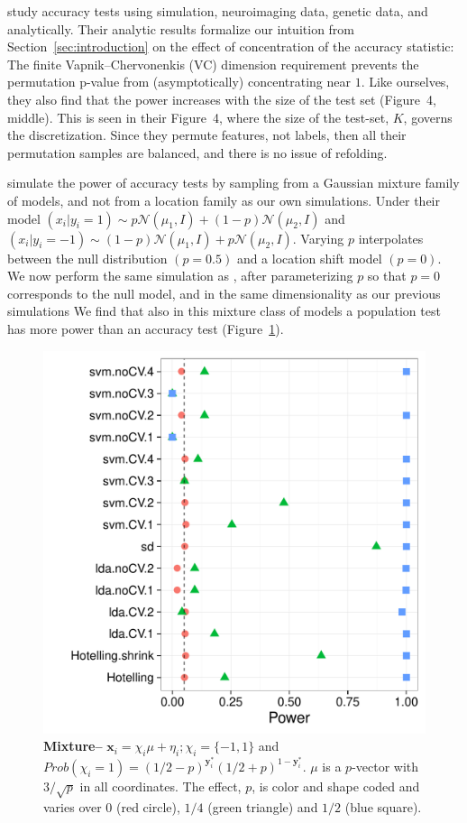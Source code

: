 \documentclass[12pt,a4paper]{article}
\theoremstyle{definition}
\newcommand{\set}[1]{\{ #1 \}} %
\newcommand{\prob}[1]{Prob( #1 )} %
\newcommand{\rv}[1]{\mathbf{#1}} %
\newcommand{\x}{\rv x} %
\newcommand{\y}{\rv y} %
\newcommand{\gauss}[1]{\mathcal{N}\left(#1\right)} %
\begin{document}
\cite{golland_permutation_2005} study accuracy tests using simulation, neuroimaging data, genetic data, and analytically.
Their analytic results formalize our intuition from Section~\ref{sec:introduction} on the effect of concentration of the accuracy statistic:
The finite Vapnik–Chervonenkis (VC) dimension requirement \citep[Sec 4.3]{golland_permutation_2003} prevents the permutation p-value from (asymptotically) concentrating near $1$. 
Like ourselves, they also find that the power increases with the size of the test set (Figure~4, middle). 
This is seen in their Figure~4, where the size of the test-set, $K$, governs the discretization. 
Since they permute features, not labels, then all their permutation samples are balanced, and there is no issue of refolding. 

\cite{golland_permutation_2005} simulate the power of accuracy tests by sampling from a Gaussian mixture family of models, and not from a location family as our own simulations. 
Under their model 
$(x_i|y_i=1) \sim p \gauss{\mu_1,I}+ (1-p) \gauss{\mu_2,I}$ 
and 
$(x_i|y_i=-1) \sim (1-p) \gauss{\mu_1,I}+ p \gauss{\mu_2,I}$.
Varying $p$ interpolates between the null distribution $(p=0.5)$ and a location shift model $(p=0)$. 
We now perform the same simulation as \cite{golland_permutation_2005}, after parameterizing $p$ so that $p=0$ corresponds to the null model, and in the same dimensionality as our previous simulations
We find that also in this mixture class of models a population test has more power than an accuracy test (Figure~\ref{fig:golland}).



\begin{figure}[ht]
\centering
	  \includegraphics[width=0.7\linewidth]{"art/2016-08-08 07:33:05"}
	  \caption{\textbf{Mixture--} $\x_i = \chi_i \mu + \eta_i; \chi_i = \set{-1,1}$ and $\prob{\chi_i=1}=(1/2-p)^{\y^*_i}  (1/2+p)^{1-\y^*_i}$. $\mu$ is a $p$-vector with $3/\sqrt{p}$ in all coordinates.
	  The effect, $p$, is color and shape coded and varies over $0$ (red circle), $1/4$ (green triangle) and $1/2$ (blue square). }
	\label{fig:golland}
\end{figure}
\end{document}
